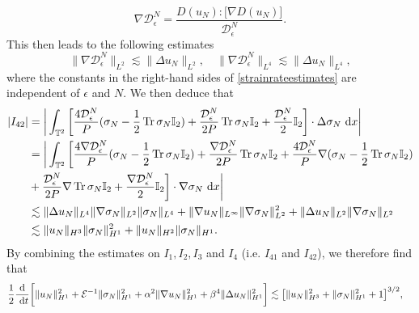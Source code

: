 \documentclass[12pt,a4paper]{article}
\theoremstyle{definition}
\theoremstyle{remark}
\numberwithin{equation}{section}
\newcommand{\dx}{\ {\rm d} {x}}
\newcommand{\dt}{\ {\rm d} t }
\DeclareMathOperator{\Tr}{Tr}
\begin{document}
\begin{equation*}
\nabla \mathcal{D}_\epsilon^N = \frac{D(u_N) : \big[ \nabla D(u_N) \big]}{\mathcal{D}_\epsilon^N}.
\end{equation*}
This then leads to the following estimates
\begin{equation} \label{strainrateestimates}
\lVert \nabla \mathcal{D}_\epsilon^N \rVert_{L^2} \lesssim \lVert \Delta u_N \rVert_{L^2}, \quad \lVert \nabla \mathcal{D}_\epsilon^N \rVert_{L^4} \lesssim \lVert \Delta u_N \rVert_{L^4},
\end{equation}
where the constants in the right-hand sides of \eqref{strainrateestimates} are independent of $\epsilon$ and $N$. We then deduce that
\begin{align*}
\lvert I_{42} \rvert &= \bigg\lvert \int_{\mathbb{T}^2} \bigg[ \frac{4 \mathcal{D}_\epsilon^N}{P} (\sigma_N - \frac{1}{2} \Tr \sigma_N \mathbb I_2) + \frac{\mathcal{D}_\epsilon^N}{2 P} \Tr \sigma_N \mathbb I_2 + \frac{\mathcal{D}_\epsilon^N}{2} \mathbb I_2 \bigg] \cdot \Delta \sigma_N \dx \bigg\rvert \\
&= \bigg\lvert \int_{\mathbb{T}^2} \bigg[ \frac{4 \nabla \mathcal{D}_\epsilon^N}{P} (\sigma_N - \frac{1}{2} \Tr \sigma_N \mathbb I_2) + \frac{\nabla \mathcal{D}_\epsilon^N}{2 P} \Tr \sigma_N \mathbb I_2 + \frac{4 \mathcal{D}_\epsilon^N}{P} \nabla (\sigma_N - \frac{1}{2} \Tr \sigma_N \mathbb I_2) \\
&+ \frac{\mathcal{D}_\epsilon^N}{2 P} \nabla \Tr \sigma_N \mathbb I_2 + \frac{\nabla \mathcal{D}_\epsilon^N}{2} \mathbb I_2 \bigg] \cdot \nabla \sigma_N \dx \bigg\rvert \\
&\lesssim \lVert \Delta u_N \rVert_{L^4} \lVert \nabla \sigma_N \rVert_{L^2} \lVert \sigma_N \rVert_{L^4} + \lVert \nabla u_N \rVert_{L^\infty} \lVert \nabla \sigma_N \rVert_{L^2}^2 + \lVert \Delta u_N \rVert_{L^2} \lVert \nabla \sigma_N \rVert_{L^2} \\
&\lesssim \lVert u_N \rVert_{H^3} \lVert \sigma_N \rVert_{H^1}^2 + \lVert u_N \rVert_{H^2} \lVert \sigma_N \rVert_{H^1}.
\end{align*}
By combining the estimates on $I_1, I_2, I_3$ and $I_4$ (i.e. $I_{41}$ and $I_{42}$), we therefore find that
\begin{align*}
&\frac{1}{2} \frac{\textrm{d}}{\dt} \bigg[ \lVert u_N \rVert_{H^1}^2 + \mathcal{E}^{-1} \lVert \sigma_N \rVert_{H^1}^2 + \alpha^2 \lVert \nabla u_N \rVert_{H^1}^2 + \beta^4 \lVert \Delta u_N \rVert_{H^1}^2 \bigg] \lesssim \big[ \lVert u_N \rVert_{H^3}^2 + \lVert \sigma_N \rVert_{H^1}^2 + 1 \big]^{3/2},
\end{align*}
\end{document}
